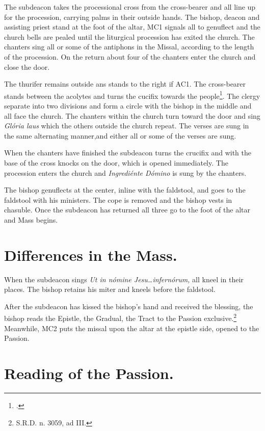 {\rubric The subdeacon takes the processional cross from the cross-bearer and
all line up for the procession, carrying palms in their outside hands. The
bishop, deacon and assisting priest stand at the foot of the altar, MC1 signals
all to genuflect and the church bells are pealed until the liturgical
procession has exited the church. The chanters sing all or some of the
antiphons in the Missal, according to the length of the procession. On the
return about four of the chanters enter the church and close the door.

\rubric The thurifer remains outside ans stands to the right if AC1. The
cross-bearer stands between the acolytes and turns the cucifix towards the
people\footcite[][147, p. 170.]{stehle}. The clergy separate into two divisions
and form a circle with the bishop in the middle and all face the church. The
chanters within the church turn toward the door and sing \textit{Glória laus}
which the others outside the church repeat. The verses are sung in the same
alternating manner,and either all or some of the verses are sung.

\rubric When the chanters have finished the subdeacon turns the crucifix and
with the base of the cross knocks on the door, which is opened immediately. The
procession enters the church  and \textit{Ingrediénte Dómino} is sung by the
chanters.

\rubric The bishop genuflects at the center, inline with the faldstool, and
goes to the faldstool with his ministers. The cope is removed and the bishop
vests in chasuble. Once the subdeacon has returned all three go to the foot of
the altar and Mass begins.

\section{Differences in the Mass.}

\rubric When the subdeacon sings \textit{Ut in nómine Jesu\dots infernórum,}
all kneel in their places. The bishop retains his miter and kneels before the
faldstool.

\rubric After the subdeacon has kissed the bishop's hand and received the
blessing, the bishop reads the Epistle, the Gradual, the Tract to the Passion
exclusive.\footnote{S.R.D. n. 3059, ad III.} Meanwhile, MC2 puts the missal
upon the altar at the epistle side, opened to the Passion.

\section{Reading of the Passion.}

}
